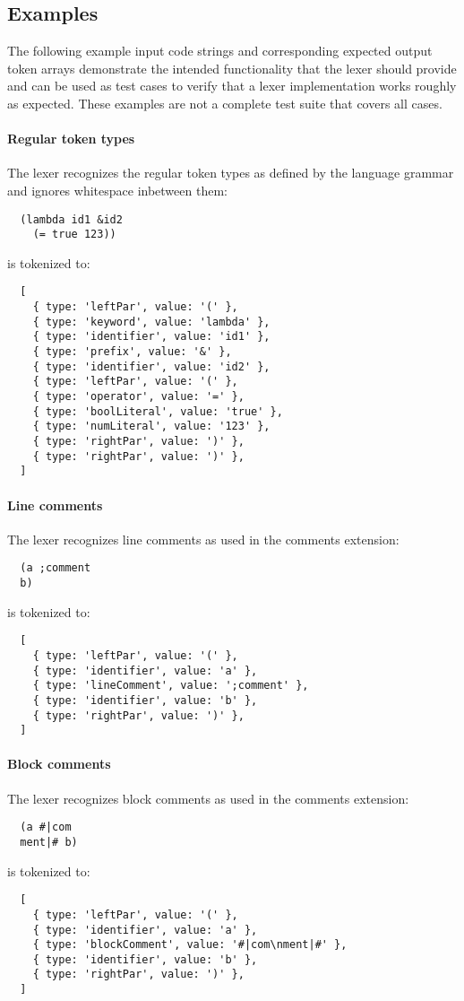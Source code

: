 \subsection{Examples}
The following example input code strings and corresponding expected output token arrays
demonstrate the intended functionality that the lexer should provide
and can be used as test cases to verify that a lexer implementation works roughly as expected.
These examples are not a complete test suite that covers all cases.

\paragraph{Regular token types}
The lexer recognizes the regular token types
as defined by the language grammar
and ignores whitespace inbetween them:
\begin{verbatim}
  (lambda id1 &id2
    (= true 123))
\end{verbatim}
is tokenized to:
\begin{verbatim}
  [
    { type: 'leftPar', value: '(' },
    { type: 'keyword', value: 'lambda' },
    { type: 'identifier', value: 'id1' },
    { type: 'prefix', value: '&' },
    { type: 'identifier', value: 'id2' },
    { type: 'leftPar', value: '(' },
    { type: 'operator', value: '=' },
    { type: 'boolLiteral', value: 'true' },
    { type: 'numLiteral', value: '123' },
    { type: 'rightPar', value: ')' },
    { type: 'rightPar', value: ')' },
  ]
\end{verbatim}

\paragraph{Line comments}
The lexer recognizes line comments
as used in the comments extension:
\begin{verbatim}
  (a ;comment
  b)
\end{verbatim}
is tokenized to:
\begin{verbatim}
  [
    { type: 'leftPar', value: '(' },
    { type: 'identifier', value: 'a' },
    { type: 'lineComment', value: ';comment' },
    { type: 'identifier', value: 'b' },
    { type: 'rightPar', value: ')' },
  ]
\end{verbatim}

\paragraph{Block comments}
The lexer recognizes block comments
as used in the comments extension:
\begin{verbatim}
  (a #|com
  ment|# b)
\end{verbatim}
is tokenized to:
\begin{verbatim}
  [
    { type: 'leftPar', value: '(' },
    { type: 'identifier', value: 'a' },
    { type: 'blockComment', value: '#|com\nment|#' },
    { type: 'identifier', value: 'b' },
    { type: 'rightPar', value: ')' },
  ]
\end{verbatim}

